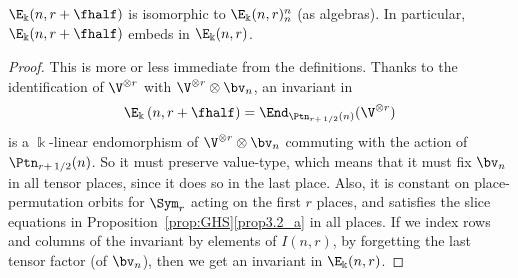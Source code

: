 \begin{lemm}\label{lem:half-iso}
$\E_\Bbbk(n,r+\fhalf)$ is isomorphic to $\E_\Bbbk(n,r)^n_n$ (as
 algebras). In particular, $\E_\Bbbk(n,r+\fhalf)$ embeds in
 $\E_\Bbbk(n,r)$.
\end{lemm}

\begin{proof}
This is more or less immediate from the definitions. Thanks to the
identification of $\V^{\otimes r}$ with $\V^{\otimes r} \otimes
\bv_n$, an invariant in
\[
\E_\Bbbk\left(n,r+\fhalf\right) = \End_{\Ptn_{r+\,1/2}(n)}(\V^{\otimes r})
\]
is a $\Bbbk$-linear endomorphism of $\V^{\otimes r} \otimes \bv_n$
commuting with the action of $\Ptn_{r+\,1/2}(n)$. So it must preserve
value-type, which means that it must fix $\bv_n$ in all tensor places,
since it does so in the last place. Also, it is constant on
place-permutation orbits for $\Sym_r$ acting on the first $r$ places,
and satisfies the slice equations in Proposition~\ref{prop:GHS}\ref{prop3.2_a} in
all places. If we index rows and columns of the invariant by elements
of $I(n,r)$, by forgetting the last tensor factor (of $\bv_n$), then
we get an invariant in $\E_\Bbbk(n,r)$.
\end{proof}

